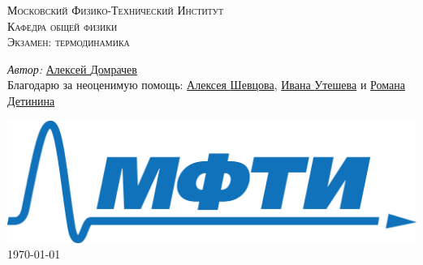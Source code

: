 
	\begin{titlepage}
		
		
		
		\center %
		
		
		
		
		\textsc{\LARGE Московский Физико-Технический Институт}\\[1,5cm] %
		\textsc{\Large Кафедра общей физики}\\[0.5cm]
		\textsc{\large Экзамен: термодинамика}\\[0.5cm] %
		
		

		
		
		
		
			\begin{center} \large
				\emph{Автор:} \href{https://vk.com/domrachev_alexey}{Алексей \textsf{Домрачев}}\\
				Благодарю за неоценимую помощь: \href{https://vk.com/shevtsovalexey}{Алексея \textsf{Шевцова}}, \href{https://vk.com/uteshevia}{Ивана \textsf{Утешева}} и \href{https://vk.com/detinin_roman}{Романа \textsf{Детинина}}
			\end{center}

		
		
		\begin{bottompar}
			\includegraphics[width = 80 mm]{logo.png}	\\[1,0cm]
			{\large \today}
		\end{bottompar}
		\vfill %
		
	\end{titlepage}

